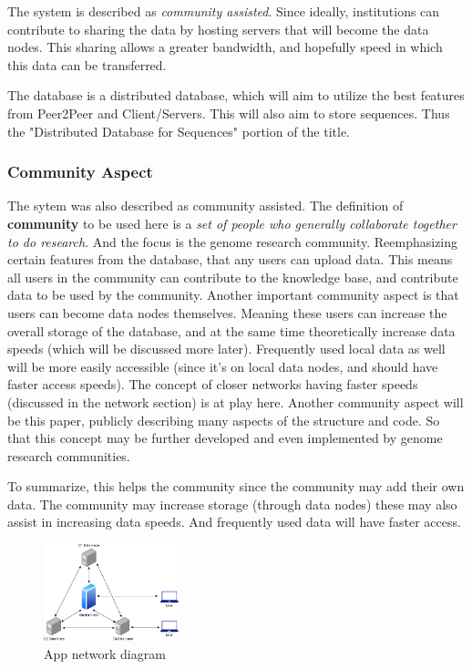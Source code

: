 \documentclass[acmsmall]{acmart}
\begin{document}
The system is described as \textit{community assisted}. Since ideally, institutions can contribute to sharing the data by hosting servers that will become the data nodes. This sharing allows a greater bandwidth, and hopefully speed in which this data can be transferred. 

The database is a distributed database, which will aim to utilize the best features from Peer2Peer and Client/Servers. This will also aim to store sequences. Thus the "Distributed Database for Sequences" portion of the title.

\subsubsection{Community Aspect}
The sytem was also described as community assisted. The definition of \textbf{community} to be used here is a \textit{set of people who generally collaborate together to do research}. And the focus is the genome research community. Reemphasizing certain features from the database, that any users can upload data. This means all users in the community can contribute to the knowledge base, and contribute data to be used by the community. Another important community aspect is that users can become data nodes themselves. Meaning these users can increase the overall storage of the database, and at the same time theoretically increase data speeds (which will be discussed more later). Frequently used local data as well will be more easily accessible (since it's on local data nodes, and should have faster access speeds). The concept of closer networks having faster speeds (discussed in the network section) is at play here. Another community aspect will be this paper, publicly describing many aspects of the structure and code. So that this concept may be further developed and even implemented by genome research communities.

To summarize, this helps the community since the community may add their own data. The community may increase storage (through data nodes) these may also assist in increasing data speeds. And frequently used data will have faster access. 



\begin{figure}[h]
\caption{App network diagram}
\centering
\includegraphics[width=0.35\textwidth]{images/thesis1.png} 
\end{figure}
\end{document}
